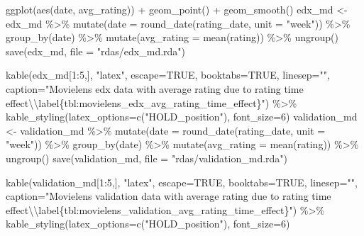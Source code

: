 \documentclass[
]{article}
\newenvironment{Shaded}{}{}
\newcommand{\AttributeTok}[1]{\textcolor[rgb]{0.49,0.56,0.16}{#1}}
\newcommand{\ConstantTok}[1]{\textcolor[rgb]{0.53,0.00,0.00}{#1}}
\newcommand{\DecValTok}[1]{\textcolor[rgb]{0.25,0.63,0.44}{#1}}
\newcommand{\FunctionTok}[1]{\textcolor[rgb]{0.02,0.16,0.49}{#1}}
\newcommand{\NormalTok}[1]{#1}
\newcommand{\OtherTok}[1]{\textcolor[rgb]{0.00,0.44,0.13}{#1}}
\newcommand{\SpecialCharTok}[1]{\textcolor[rgb]{0.25,0.44,0.63}{#1}}
\newcommand{\StringTok}[1]{\textcolor[rgb]{0.25,0.44,0.63}{#1}}
\begin{document}
\begin{Shaded}
\begin{Highlighting}[]
  \FunctionTok{ggplot}\NormalTok{(}\FunctionTok{aes}\NormalTok{(date, avg\_rating)) }\SpecialCharTok{+}
  \FunctionTok{geom\_point}\NormalTok{() }\SpecialCharTok{+}
  \FunctionTok{geom\_smooth}\NormalTok{()}
\NormalTok{edx\_md }\OtherTok{\textless{}{-}}\NormalTok{ edx\_md }\SpecialCharTok{\%\textgreater{}\%} \FunctionTok{mutate}\NormalTok{(}\AttributeTok{date =} \FunctionTok{round\_date}\NormalTok{(rating\_date, }\AttributeTok{unit =} \StringTok{"week"}\NormalTok{)) }\SpecialCharTok{\%\textgreater{}\%}
  \FunctionTok{group\_by}\NormalTok{(date) }\SpecialCharTok{\%\textgreater{}\%}
  \FunctionTok{mutate}\NormalTok{(}\AttributeTok{avg\_rating =} \FunctionTok{mean}\NormalTok{(rating)) }\SpecialCharTok{\%\textgreater{}\%} \FunctionTok{ungroup}\NormalTok{()}
\FunctionTok{save}\NormalTok{(edx\_md, }\AttributeTok{file =} \StringTok{"rdas/edx\_md.rda"}\NormalTok{)}

\FunctionTok{kable}\NormalTok{(edx\_md[}\DecValTok{1}\SpecialCharTok{:}\DecValTok{5}\NormalTok{,], }\StringTok{"latex"}\NormalTok{, }\AttributeTok{escape=}\ConstantTok{TRUE}\NormalTok{, }\AttributeTok{booktabs=}\ConstantTok{TRUE}\NormalTok{, }\AttributeTok{linesep=}\StringTok{""}\NormalTok{, }\AttributeTok{caption=}\StringTok{"Movielens edx data with average rating due to rating time effect}\SpecialCharTok{\textbackslash{}\textbackslash{}}\StringTok{label\{tbl:movielens\_edx\_avg\_rating\_time\_effect\}"}\NormalTok{) }\SpecialCharTok{\%\textgreater{}\%}
    \FunctionTok{kable\_styling}\NormalTok{(}\AttributeTok{latex\_options=}\FunctionTok{c}\NormalTok{(}\StringTok{"HOLD\_position"}\NormalTok{), }\AttributeTok{font\_size=}\DecValTok{6}\NormalTok{)}
\NormalTok{validation\_md }\OtherTok{\textless{}{-}}\NormalTok{ validation\_md }\SpecialCharTok{\%\textgreater{}\%} \FunctionTok{mutate}\NormalTok{(}\AttributeTok{date =} \FunctionTok{round\_date}\NormalTok{(rating\_date, }\AttributeTok{unit =} \StringTok{"week"}\NormalTok{)) }\SpecialCharTok{\%\textgreater{}\%}
  \FunctionTok{group\_by}\NormalTok{(date) }\SpecialCharTok{\%\textgreater{}\%}
  \FunctionTok{mutate}\NormalTok{(}\AttributeTok{avg\_rating =} \FunctionTok{mean}\NormalTok{(rating)) }\SpecialCharTok{\%\textgreater{}\%} \FunctionTok{ungroup}\NormalTok{()}
\FunctionTok{save}\NormalTok{(validation\_md, }\AttributeTok{file =} \StringTok{"rdas/validation\_md.rda"}\NormalTok{)}

\FunctionTok{kable}\NormalTok{(validation\_md[}\DecValTok{1}\SpecialCharTok{:}\DecValTok{5}\NormalTok{,], }\StringTok{"latex"}\NormalTok{, }\AttributeTok{escape=}\ConstantTok{TRUE}\NormalTok{, }\AttributeTok{booktabs=}\ConstantTok{TRUE}\NormalTok{, }\AttributeTok{linesep=}\StringTok{""}\NormalTok{, }\AttributeTok{caption=}\StringTok{"Movielens validation data with average rating due to rating time effect}\SpecialCharTok{\textbackslash{}\textbackslash{}}\StringTok{label\{tbl:movielens\_validation\_avg\_rating\_time\_effect\}"}\NormalTok{) }\SpecialCharTok{\%\textgreater{}\%}
    \FunctionTok{kable\_styling}\NormalTok{(}\AttributeTok{latex\_options=}\FunctionTok{c}\NormalTok{(}\StringTok{"HOLD\_position"}\NormalTok{), }\AttributeTok{font\_size=}\DecValTok{6}\NormalTok{)}


\end{Highlighting}
\end{Shaded}
\end{document}
